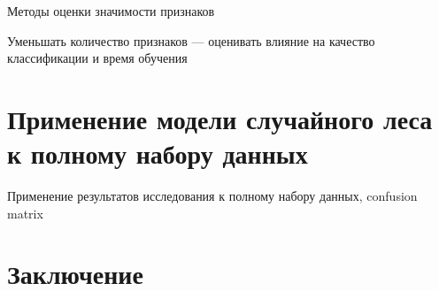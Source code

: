 \documentclass[14pt, a4paper, oneside]{extarticle}
\begin{document}
Методы оценки значимости признаков

Уменьшать количество признаков --- оценивать влияние на качество классификации и время обучения
\newpage

\section{Применение модели случайного леса к полному набору данных}
Применение результатов исследования к полному набору данных, confusion matrix
\newpage



\section{Заключение}
\newpage
\end{document}
